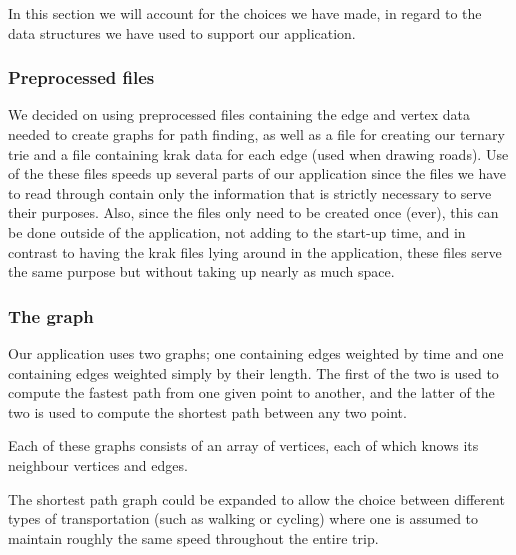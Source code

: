 

In this section we will account for the choices we have made, in regard to the data structures we have used to support our application.

\subsubsection{Preprocessed files}

We decided on using preprocessed files containing the edge and vertex data needed to create graphs for path finding, as well as a file for creating our ternary trie and a file containing krak data for each edge (used when drawing roads). Use of the these files speeds up several parts of our application since the files we have to read through contain only the information that is strictly necessary to serve their purposes. Also, since the files only need to be created once (ever), this can be done outside of the application, not adding to the start-up time, and in contrast to having the krak files lying around in the application, these files serve the same purpose but without taking up nearly as much space.

\subsubsection{The graph}
Our application uses two graphs; one containing edges weighted by time and one containing edges weighted simply by their length. The first of the two is used to compute the fastest path from one given point to another, and the latter of the two is used to compute the shortest path between any two point. 

Each of these graphs consists of an array of vertices, each of which knows its neighbour vertices and edges.		

The shortest path graph could be expanded to allow the choice between different types of transportation (such as walking or cycling) where one is assumed to maintain roughly the same speed throughout the entire trip.
